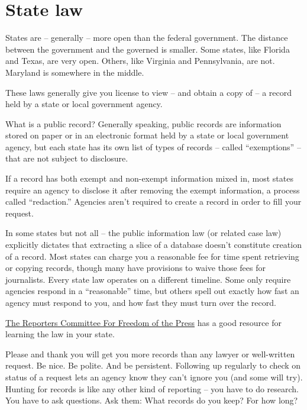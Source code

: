\documentclass[
  letterpaper,
  DIV=11,
  numbers=noendperiod]{scrreprt}
\begin{document}
\hypertarget{state-law}{%
\section{State law}\label{state-law}}

States are -- generally -- more open than the federal government. The
distance between the government and the governed is smaller. Some
states, like Florida and Texas, are very open. Others, like Virginia and
Pennsylvania, are not. Maryland is somewhere in the middle.

These laws generally give you license to view -- and obtain a copy of --
a record held by a state or local government agency.

What is a public record? Generally speaking, public records are
information stored on paper or in an electronic format held by a state
or local government agency, but each state has its own list of types of
records -- called ``exemptions'' -- that are not subject to disclosure.

If a record has both exempt and non-exempt information mixed in, most
states require an agency to disclose it after removing the exempt
information, a process called ``redaction.'' Agencies aren't required to
create a record in order to fill your request.

In some states but not all -- the public information law (or related
case law) explicitly dictates that extracting a slice of a database
doesn't constitute creation of a record. Most states can charge you a
reasonable fee for time spent retrieving or copying records, though many
have provisions to waive those fees for journalists. Every state law
operates on a different timeline. Some only require agencies respond in
a ``reasonable'' time, but others spell out exactly how fast an agency
must respond to you, and how fast they must turn over the record.

\href{https://www.rcfp.org/open-government-guide/}{The Reporters
Committee For Freedom of the Press} has a good resource for learning the
law in your state.

Please and thank you will get you more records than any lawyer or
well-written request. Be nice. Be polite. And be persistent. Following
up regularly to check on status of a request lets an agency know they
can't ignore you (and some will try). Hunting for records is like any
other kind of reporting -- you have to do research. You have to ask
questions. Ask them: What records do you keep? For how long?
\end{document}
